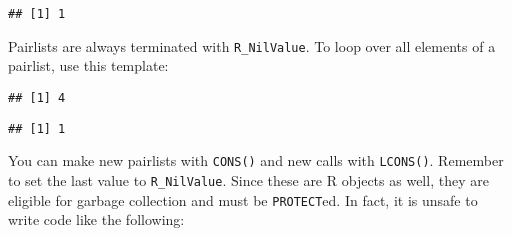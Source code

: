 \begin{verbatim}
## [1] 1
\end{verbatim}

Pairlists are always terminated with \texttt{R\_NilValue}. To loop over
all elements of a pairlist, use this template:

\begin{Shaded}
\begin{Highlighting}[]
\StringTok{ }\NormalTok{(}\NormalTok{(} \NormalTok{), }

\StringTok{  \}}
\NormalTok{)}
\NormalTok{(}\NormalTok{(}
\end{Highlighting}
\end{Shaded}

\begin{verbatim}
## [1] 4
\end{verbatim}

\begin{Shaded}
\begin{Highlighting}[]
\NormalTok{(}\NormalTok{(}\NormalTok{()))}
\end{Highlighting}
\end{Shaded}

\begin{verbatim}
## [1] 1
\end{verbatim}

You can make new pairlists with \texttt{CONS()} and new calls with
\texttt{LCONS()}. Remember to set the last value to
\texttt{R\_NilValue}. Since these are R objects as well, they are
eligible for garbage collection and must be \texttt{PROTECT}ed. In fact,
it is unsafe to write code like the following:

\begin{Shaded}
\begin{Highlighting}[]
\StringTok{ }\NormalTok{(}\NormalTok{, }
\StringTok{    )}
\StringTok{  ));}
\NormalTok{)}
\NormalTok{(}\NormalTok{)}
\NormalTok{()}
\end{Highlighting}
\end{Shaded}

